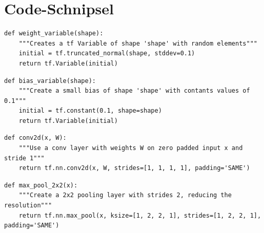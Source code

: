 \documentclass[10pt,journal,compsoc]{IEEEtran}
\begin{document}
\section{Code-Schnipsel}

\begin{lstlisting}[caption={Erzeugt ein Gewichts-Array mit zufällig initialisierten Werten. Die Dimensionen werden als Parameter entegengenommen.}, label=lst1]
def weight_variable(shape):
    """Creates a tf Variable of shape 'shape' with random elements"""
    initial = tf.truncated_normal(shape, stddev=0.1)
    return tf.Variable(initial)
\end{lstlisting}

\begin{lstlisting}[caption={Erzeugt ein bias-Array mit zufällig initialisierten Werten. Die Dimensionen werden als Parameter entegengenommen.}, label=lst2]
def bias_variable(shape):
    """Create a small bias of shape 'shape' with contants values of 0.1"""
    initial = tf.constant(0.1, shape=shape)
    return tf.Variable(initial)
\end{lstlisting}

\begin{lstlisting}[caption={Eine zweidimensionale Faltung mit Eingabe x und Filter W.}, label=lst3]
def conv2d(x, W):
    """Use a conv layer with weights W on zero padded input x and stride 1"""
    return tf.nn.conv2d(x, W, strides=[1, 1, 1, 1], padding='SAME')
\end{lstlisting}

\begin{lstlisting}[caption={Hier wird 2x2 max pooling auf die Eingabe x angewendet.}, label=lst4]
def max_pool_2x2(x):
    """Create a 2x2 pooling layer with strides 2, reducing the resolution"""
    return tf.nn.max_pool(x, ksize=[1, 2, 2, 1], strides=[1, 2, 2, 1], padding='SAME')
\end{lstlisting}
\end{document}
